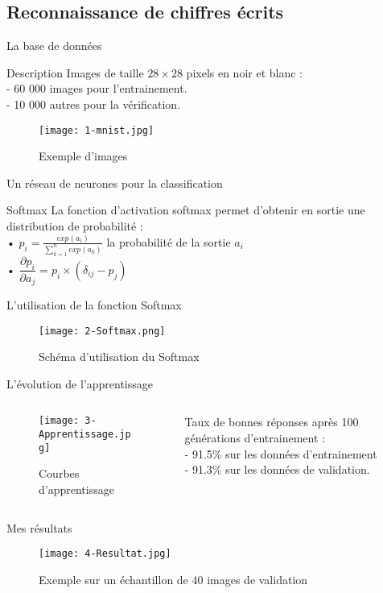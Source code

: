 \subsection{Reconnaissance de chiffres écrits}

\begin{frame}{La base de données}
	\begin{block}{Description}
		Images de taille $28 \times 28$ pixels en noir et blanc : \\
		\quad - 60 000 images pour l'entrainement. \\
		\quad - 10 000 autres pour la vérification.
	\end{block}
	\begin{figure}
		\centering
		\texttt{[image: 1-mnist.jpg]}
		\caption{Exemple d'images}
	\end{figure}
\end{frame}


\begin{frame}{Un réseau de neurones pour la classification}
	\begin{block}{Softmax}
		La fonction d'activation softmax permet d'obtenir en sortie une distribution de probabilité : \\
		• $p_i = \frac{exp(a_i)}{\sum_{k=1}^{n}exp(a_k)}$ la probabilité de la sortie $a_i$ \\
		• $\dfrac{\partial p_i}{\partial a_j} = p_i\times(\delta_{ij}-p_j)$ \\
	\end{block}
\end{frame}



\begin{frame}{L'utilisation de la fonction Softmax}
	\begin{figure}
		\centering
		\texttt{[image: 2-Softmax.png]}
		\caption{Schéma d'utilisation du Softmax}
	\end{figure}
\end{frame}


\begin{frame}{L'évolution de l'apprentissage}
	\begin{columns}[T] %
		\begin{column}{.58\textwidth}
			\begin{figure}
				\centering
				\texttt{[image: 3-Apprentissage.jpg]}
				\caption{Courbes d'apprentissage}
			\end{figure}
		\end{column}
		\hfill
		\begin{column}{.54\textwidth}
			\bigskip	\bigskip	\bigskip
			\bigskip	\bigskip	\bigskip
			\bigskip	\bigskip	\bigskip
			Taux de bonnes réponses après 100 générations d'entrainement : \\
			- 91.5\% sur les données d'entrainement \\
			- 91.3\% sur les données de validation. \\
		\end{column}%
	\end{columns}
\end{frame}


\begin{frame}{Mes résultats}
	\begin{figure}
		\centering
		\texttt{[image: 4-Resultat.jpg]}
		\caption{Exemple sur un échantillon de 40 images de validation}
	\end{figure}
\end{frame}

